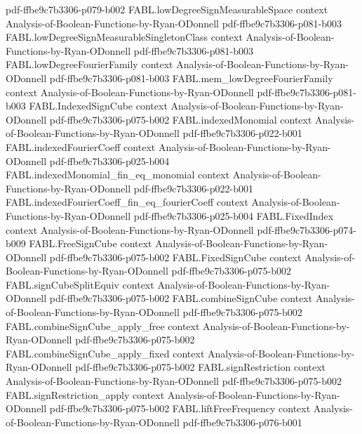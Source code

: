 \begin{theorem}
  {pdf-ffbe9c7b3306-p079-b002}
\proofstep
  {FABL.lowDegreeSignMeasurableSpace}
  {context}
  {Analysis-of-Boolean-Functions-by-Ryan-ODonnell}
  {pdf-ffbe9c7b3306-p081-b003}
\proofstep
  {FABL.lowDegreeSignMeasurableSingletonClass}
  {context}
  {Analysis-of-Boolean-Functions-by-Ryan-ODonnell}
  {pdf-ffbe9c7b3306-p081-b003}
\proofstep
  {FABL.lowDegreeFourierFamily}
  {context}
  {Analysis-of-Boolean-Functions-by-Ryan-ODonnell}
  {pdf-ffbe9c7b3306-p081-b003}
\proofstep
  {FABL.mem_lowDegreeFourierFamily}
  {context}
  {Analysis-of-Boolean-Functions-by-Ryan-ODonnell}
  {pdf-ffbe9c7b3306-p081-b003}
\proofstep
  {FABL.IndexedSignCube}
  {context}
  {Analysis-of-Boolean-Functions-by-Ryan-ODonnell}
  {pdf-ffbe9c7b3306-p075-b002}
\proofstep
  {FABL.indexedMonomial}
  {context}
  {Analysis-of-Boolean-Functions-by-Ryan-ODonnell}
  {pdf-ffbe9c7b3306-p022-b001}
\proofstep
  {FABL.indexedFourierCoeff}
  {context}
  {Analysis-of-Boolean-Functions-by-Ryan-ODonnell}
  {pdf-ffbe9c7b3306-p025-b004}
\proofstep
  {FABL.indexedMonomial_fin_eq_monomial}
  {context}
  {Analysis-of-Boolean-Functions-by-Ryan-ODonnell}
  {pdf-ffbe9c7b3306-p022-b001}
\proofstep
  {FABL.indexedFourierCoeff_fin_eq_fourierCoeff}
  {context}
  {Analysis-of-Boolean-Functions-by-Ryan-ODonnell}
  {pdf-ffbe9c7b3306-p025-b004}
\proofstep
  {FABL.FixedIndex}
  {context}
  {Analysis-of-Boolean-Functions-by-Ryan-ODonnell}
  {pdf-ffbe9c7b3306-p074-b009}
\proofstep
  {FABL.FreeSignCube}
  {context}
  {Analysis-of-Boolean-Functions-by-Ryan-ODonnell}
  {pdf-ffbe9c7b3306-p075-b002}
\proofstep
  {FABL.FixedSignCube}
  {context}
  {Analysis-of-Boolean-Functions-by-Ryan-ODonnell}
  {pdf-ffbe9c7b3306-p075-b002}
\proofstep
  {FABL.signCubeSplitEquiv}
  {context}
  {Analysis-of-Boolean-Functions-by-Ryan-ODonnell}
  {pdf-ffbe9c7b3306-p075-b002}
\proofstep
  {FABL.combineSignCube}
  {context}
  {Analysis-of-Boolean-Functions-by-Ryan-ODonnell}
  {pdf-ffbe9c7b3306-p075-b002}
\proofstep
  {FABL.combineSignCube_apply_free}
  {context}
  {Analysis-of-Boolean-Functions-by-Ryan-ODonnell}
  {pdf-ffbe9c7b3306-p075-b002}
\proofstep
  {FABL.combineSignCube_apply_fixed}
  {context}
  {Analysis-of-Boolean-Functions-by-Ryan-ODonnell}
  {pdf-ffbe9c7b3306-p075-b002}
\proofstep
  {FABL.signRestriction}
  {context}
  {Analysis-of-Boolean-Functions-by-Ryan-ODonnell}
  {pdf-ffbe9c7b3306-p075-b002}
\proofstep
  {FABL.signRestriction_apply}
  {context}
  {Analysis-of-Boolean-Functions-by-Ryan-ODonnell}
  {pdf-ffbe9c7b3306-p075-b002}
\proofstep
  {FABL.liftFreeFrequency}
  {context}
  {Analysis-of-Boolean-Functions-by-Ryan-ODonnell}
  {pdf-ffbe9c7b3306-p076-b001}

\end{theorem}
